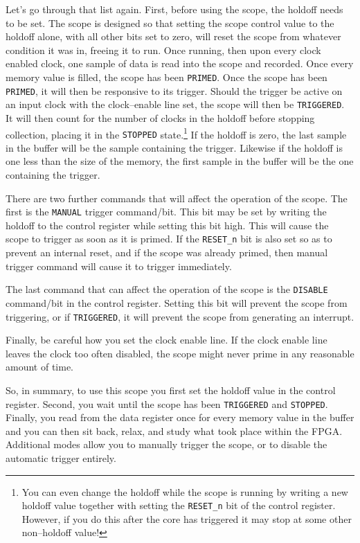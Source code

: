 \documentclass{gqtekspec}
\begin{document}
Let's go through that list again.  First, before using the scope, the holdoff
needs to be set.  The scope is designed so that setting the scope control value
to the holdoff alone, with all other bits set to zero, will reset the scope
from whatever condition it was in,
freeing it to run.  Once running, then upon every clock enabled clock, one
sample of data is read into the scope and recorded.  Once every memory value
is filled, the scope has been {\tt PRIMED}.  Once the scope has been
{\tt PRIMED}, it will then be responsive to its trigger.  Should the trigger be
active on an input clock with the clock--enable line set, the scope will then
be {\tt TRIGGERED}.  It
will then count for the number of clocks in the holdoff before stopping 
collection, placing it in the {\tt STOPPED} state.\footnote{You can even
change the holdoff while the scope is running by writing a new holdoff value
together with setting the {\tt RESET\_n} bit of the control register.  However,
if you do this after the core has triggered it may stop at some other
non--holdoff value!}  If the holdoff is zero, the last sample in the buffer
will be the sample containing the trigger.  Likewise if the holdoff is one
less than the size of the memory, the first sample in the buffer will be the
one containing the trigger.
 
There are two further commands that will affect the operation of the scope.  The
first is the {\tt MANUAL} trigger command/bit.  This bit may be set by writing
the holdoff to the control register while setting this bit high.  This will
cause the scope to trigger as soon as it is primed.  If the {\tt RESET\_n} 
bit is also set so as to prevent an internal reset, and if the scope was already
primed, then manual trigger command will cause it to trigger immediately.

The last command that can affect the operation of the scope is the {\tt DISABLE}
command/bit in the control register.  Setting this bit will prevent the scope 
from triggering, or if {\tt TRIGGERED}, it will prevent the scope from
generating an interrupt.

Finally, be careful how you set the clock enable line.  If the clock enable
line leaves the clock too often disabled, the scope might never prime in any
reasonable amount of time.

So, in summary, to use this scope you first set the holdoff value in the 
control register.  Second, you wait until the scope has been {\tt TRIGGERED}
and {\tt STOPPED}.  Finally, you read from the data register once for every
memory value in the buffer and you can then sit back, relax, and study what
took place within the FPGA.  Additional modes allow you to manually trigger
the scope, or to disable the automatic trigger entirely.
 
\end{document}
